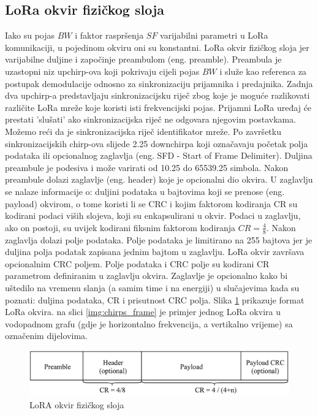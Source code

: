 \subsection{LoRa okvir fizičkog sloja}
\label{subsection:lora_frame}
Iako su pojas $BW$ i faktor raspršenja $SF$ varijabilni parametri u LoRa komunikaciji, u pojedinom okviru oni su konstantni. LoRa okvir fizičkog sloja jer varijabilne duljine i započinje preambulom (eng. preamble). Preambula je uzastopni niz upchirp-ova koji pokrivaju cijeli pojas $BW$ i služe kao referenca za postupak demodulacije odnosno za sinkronizaciju prijamnika i predajnika. Zadnja dva upchirp-a predstavljaju sinkronizacijsku riječ zbog koje je moguće razlikovati različite LoRa mreže koje koristi isti frekvencijski pojas. Prijamni LoRa uređaj će prestati 'slušati' ako sinkronizacijska riječ ne odgovara njegovim postavkama. Možemo reći da je sinkronizacijska riječ identifikator mreže. Po završetku sinkronizacijskih chirp-ova slijede 2.25 downchirpa koji označavaju početak polja podataka ili opcionalnog zaglavlja (eng. SFD - Start of Frame Delimiter). Duljina preambule je podesiva i može varirati od 10.25 do 65539.25 simbola. Nakon preambule dolazi zaglavlje (eng. header) koje je opcionalni dio okvira. U zaglavlju se nalaze informacije o: duljini podataka u bajtovima koji se prenose (eng. payload) okvirom, o tome koristi li se CRC i kojim faktorom kodiranja CR su kodirani podaci viših slojeva, koji su enkapsulirani u okvir. Podaci u zaglavlju, ako on postoji, su uvijek kodirani fiksnim faktorom kodiranja $CR = \frac{4}{8}$. Nakon zaglavlja dolazi polje podataka. Polje podataka je limitirano na 255 bajtova jer je duljina polja podatak zapisana jednim bajtom u zaglavlju. LoRa okvir završava opcionalnim CRC poljem. Polje podataka i CRC polje su kodirani CR parametrom definiranim u zaglavlju okvira. Zaglavlje je opcionalno kako bi uštedilo na vremenu slanja (a samim time i na energiji) u slučajevima kada su poznati: duljina podataka, CR i prisutnost CRC polja.
Slika \ref{img:frame} prikazuje format LoRa okvira. na slici \ref{img:chirps_frame} je primjer jednog LoRa okvira u vodopadnom grafu (gdje je horizontalno frekvencija, a vertikalno vrijeme) sa označenim dijelovima. 
\begin{figure}[ht!]
\centering
\includegraphics[width=1.0\textwidth]{images/frame.png}
\caption{LoRA okvir fizičkog sloja}
\label{img:frame}
\end{figure}

